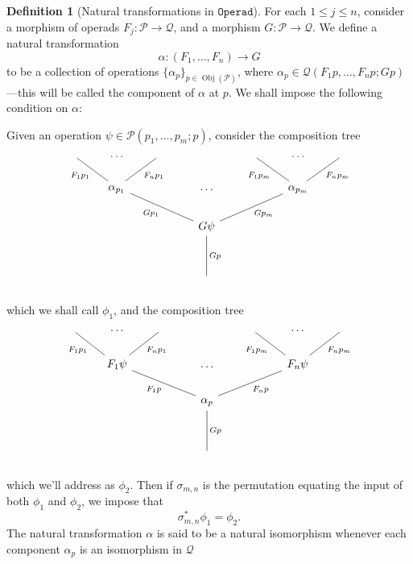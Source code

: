 \documentclass[11pt, reqno]{amsart}
\theoremstyle{definition}
\newtheorem{definition}[theorem]{Definition}
\renewcommand{\leq}{\leqslant}
\newcommand{\catfont}{\texttt}
\DeclareMathOperator{\Obj}{Obj}   %
\newcommand{\operad}{\mathcal}
\newcommand{\Operad}{{\catfont{Operad}}}
\begin{document}
\begin{definition}[Natural transformations in \(\Operad\)]
\label{def:nat-transf-in-operad}
For each \(1 \leq j \leq n\), consider a morphism of operads \(F_j: \operad P \to \operad Q\), and a morphism \(G: \operad P \to \operad Q\). We define a natural transformation
\[
    \alpha: (F_1, \dots, F_n) \longrightarrow G
\]
to be a collection of operations \(\{\alpha_p\}_{p \in \Obj(\operad P)}\),
where \(\alpha_p \in \operad Q(F_1 p, \dots, F_n p; G p)\)---this will be
called the component of \(\alpha\) at \(p\). We shall impose the following
condition on \(\alpha\):

Given an operation \(\psi \in \operad P(p_1, \dots, p_m; p)\), consider the
composition tree
\[
    \begin{tikzcd}
         \ar[rd, no head, "F_1 p_1"'] &\dots &\ar[dl, no head, "F_n p_1"]
        &
        &\ar[rd, no head, "F_1 p_m"'] &\dots &\ar[dl, no head, "F_n p_m"]
        \\
            &\alpha_{p_1} \ar[rrd, no head, "G p_1"'] &
        &\dots
        & &\alpha_{p_m} \ar[lld, no head, "G p_m"] &
        \\
          & &
        &G \psi \ar[dd, "G p", no head]
        & & &
        \\
          & &
        &
        &  & &
        \\
          & &
        &\phantom{f}
        & & &
    \end{tikzcd}
\]
which we shall call \(\phi_1\), and the composition tree
\[
    \begin{tikzcd}
         \ar[rd, no head, "F_1 p_1"'] &\dots &\ar[dl, no head, "F_n p_1"]
        &
        &\ar[rd, no head, "F_1 p_m"'] &\dots &\ar[dl, no head, "F_n p_m"]
        \\
            &F_1 \psi \ar[rrd, no head, "F_1 p"'] &
        &\dots
        & &F_n \psi \ar[lld, no head, "F_n p"] &
        \\
          & &
        &\alpha_p \ar[dd, "G p", no head]
        & & &
        \\
          & &
        &
        &  & &
        \\
          & &
        &\phantom{f}
        & & &
    \end{tikzcd}
\]
which we'll address as \(\phi_2\). Then if \(\sigma_{m, n}\) is the permutation
equating the input of both \(\phi_1\) and \(\phi_2\), we impose that
\[
    \sigma_{m, n}^* \phi_1 = \phi_2.
\]
The natural transformation \(\alpha\) is said to be a natural isomorphism
whenever each component \(\alpha_p\) is an isomorphism in \(\operad Q\)
\end{definition}
\end{document}
